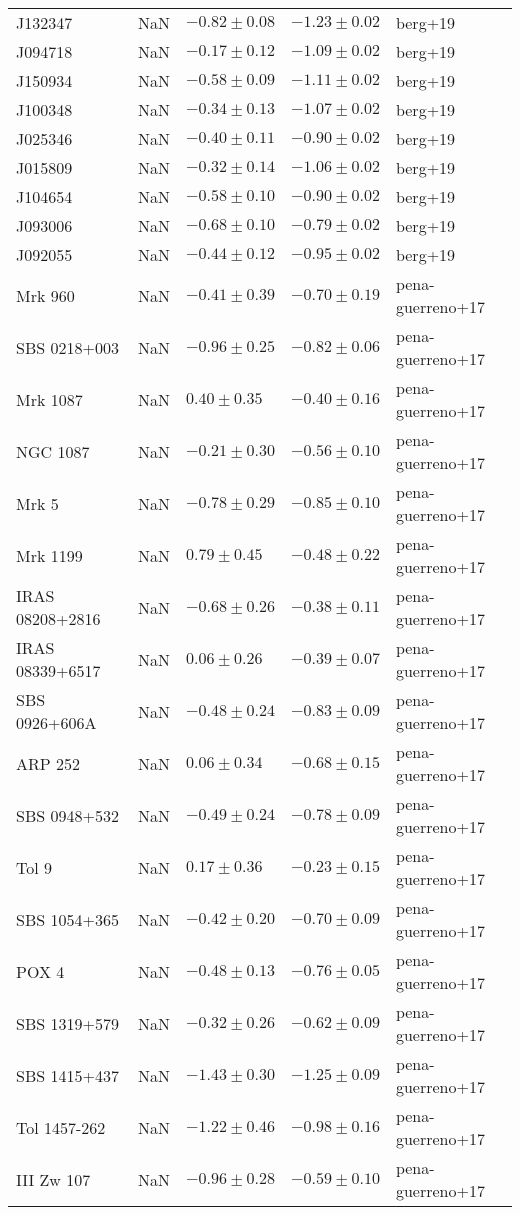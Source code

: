 \documentclass[11pt]{article}
\begin{document}
\begin{table}
\begin{longtable}{lllll}
    J132347 & NaN & $-0.82 \pm 0.08$ & $-1.23 \pm 0.02$ & berg+19 \\
    J094718 & NaN & $-0.17 \pm 0.12$ & $-1.09 \pm 0.02$ & berg+19 \\
    J150934 & NaN & $-0.58 \pm 0.09$ & $-1.11 \pm 0.02$ & berg+19 \\
    J100348 & NaN & $-0.34 \pm 0.13$ & $-1.07 \pm 0.02$ & berg+19 \\
    J025346 & NaN & $-0.40 \pm 0.11$ & $-0.90 \pm 0.02$ & berg+19 \\
    J015809 & NaN & $-0.32 \pm 0.14$ & $-1.06 \pm 0.02$ & berg+19 \\
    J104654 & NaN & $-0.58 \pm 0.10$ & $-0.90 \pm 0.02$ & berg+19 \\
    J093006 & NaN & $-0.68 \pm 0.10$ & $-0.79 \pm 0.02$ & berg+19 \\
    J092055 & NaN & $-0.44 \pm 0.12$ & $-0.95 \pm 0.02$ & berg+19 \\
    Mrk 960 & NaN & $-0.41 \pm 0.39$ & $-0.70 \pm 0.19$ & pena-guerreno+17 \\
    SBS 0218+003 & NaN & $-0.96 \pm 0.25$ & $-0.82 \pm 0.06$ & pena-guerreno+17 \\
    Mrk 1087 & NaN & $0.40 \pm 0.35$ & $-0.40 \pm 0.16$ & pena-guerreno+17 \\
    NGC 1087 & NaN & $-0.21 \pm 0.30$ & $-0.56 \pm 0.10$ & pena-guerreno+17 \\
    Mrk 5 & NaN & $-0.78 \pm 0.29$ & $-0.85 \pm 0.10$ & pena-guerreno+17 \\
    Mrk 1199 & NaN & $0.79 \pm 0.45$ & $-0.48 \pm 0.22$ & pena-guerreno+17 \\
    IRAS 08208+2816 & NaN & $-0.68 \pm 0.26$ & $-0.38 \pm 0.11$ & pena-guerreno+17 \\
    IRAS 08339+6517 & NaN & $0.06 \pm 0.26$ & $-0.39 \pm 0.07$ & pena-guerreno+17 \\
    SBS 0926+606A & NaN & $-0.48 \pm 0.24$ & $-0.83 \pm 0.09$ & pena-guerreno+17 \\
    ARP 252 & NaN & $0.06 \pm 0.34$ & $-0.68 \pm 0.15$ & pena-guerreno+17 \\
    SBS 0948+532 & NaN & $-0.49 \pm 0.24$ & $-0.78 \pm 0.09$ & pena-guerreno+17 \\
    Tol 9 & NaN & $0.17 \pm 0.36$ & $-0.23 \pm 0.15$ & pena-guerreno+17 \\
    SBS 1054+365 & NaN & $-0.42 \pm 0.20$ & $-0.70 \pm 0.09$ & pena-guerreno+17 \\
    POX 4 & NaN & $-0.48 \pm 0.13$ & $-0.76 \pm 0.05$ & pena-guerreno+17 \\
    SBS 1319+579 & NaN & $-0.32 \pm 0.26$ & $-0.62 \pm 0.09$ & pena-guerreno+17 \\
    SBS 1415+437 & NaN & $-1.43 \pm 0.30$ & $-1.25 \pm 0.09$ & pena-guerreno+17 \\
    Tol 1457-262 & NaN & $-1.22 \pm 0.46$ & $-0.98 \pm 0.16$ & pena-guerreno+17 \\
    III Zw 107 & NaN & $-0.96 \pm 0.28$ & $-0.59 \pm 0.10$ & pena-guerreno+17 \\
    \hline
    \end{longtable}

\end{table}
\end{document}
